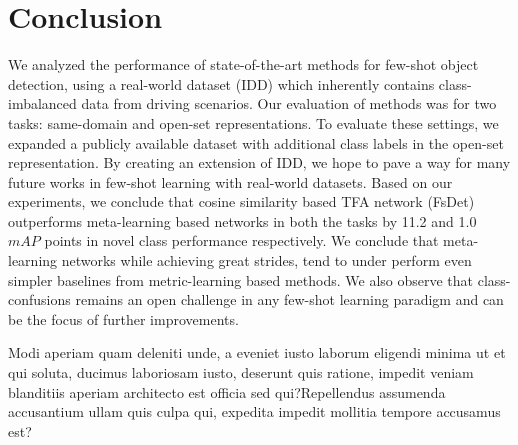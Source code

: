\documentclass[letterpaper]{article} %
\begin{document}
\section{Conclusion}
We analyzed the performance of state-of-the-art methods for few-shot object detection, using a real-world dataset (IDD) which inherently contains class-imbalanced data from driving scenarios. Our evaluation of methods was for two tasks: same-domain and open-set representations. To evaluate these settings, we expanded a publicly available dataset with additional class labels in the open-set representation. By creating an extension of IDD, we hope to pave a way for many future works in few-shot learning with real-world datasets.
Based on our experiments, we conclude that cosine similarity based TFA network (FsDet) outperforms meta-learning based networks in both the tasks by 11.2 and 1.0 $mAP$ points in novel class performance respectively. We conclude that meta-learning networks while achieving great strides, tend to under perform even simpler baselines from metric-learning based methods. We also observe that class-confusions remains an open challenge in any few-shot learning paradigm and can be the focus of further improvements.



Modi aperiam quam deleniti unde, a eveniet iusto laborum eligendi minima ut et qui soluta, ducimus laboriosam iusto, deserunt quis ratione, impedit veniam blanditiis aperiam architecto est officia sed qui?Repellendus assumenda accusantium ullam quis culpa qui, expedita impedit mollitia tempore accusamus est?\clearpage

\end{document}
